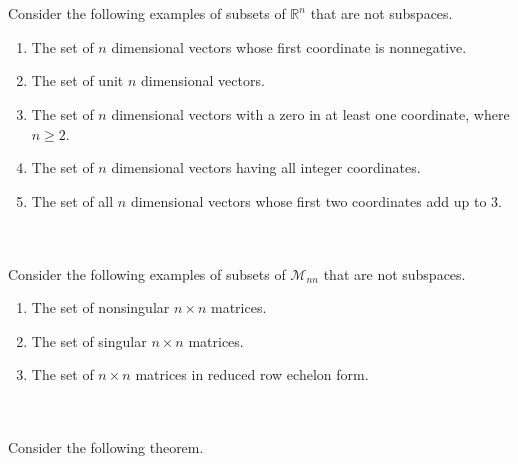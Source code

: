         \vphantom
        \\
        \\
        Consider the following examples of subsets of \(\mathbb{R}^n\) that are not subspaces.
        \begin{enumerate}
            \item The set of \(n\) dimensional vectors whose first coordinate is nonnegative.
            \item The set of unit \(n\) dimensional vectors.
            \item The set of \(n\) dimensional vectors with a zero in at least one coordinate, where \(n\geq 2\).
            \item The set of \(n\) dimensional vectors having all integer coordinates.
            \item The set of all \(n\) dimensional vectors whose first two coordinates add up to \(3\).
        \end{enumerate}
        \pagebreak
        \vphantom
        \\
        \\
        Consider the following examples of subsets of \(\mathcal{M}_{nn}\) that are not subspaces.
        \begin{enumerate}
            \item The set of nonsingular \(n\times n\) matrices.
            \item The set of singular \(n\times n\) matrices.
            \item The set of \(n\times n\) matrices in reduced row echelon form.
        \end{enumerate}
        \vphantom
        \\
        \\
        Consider the following theorem.

